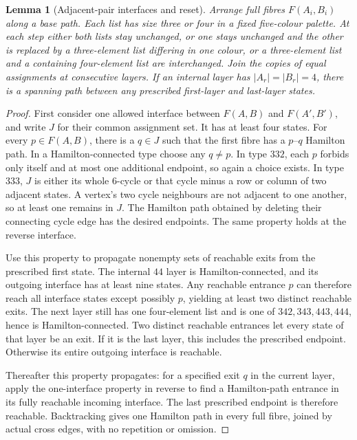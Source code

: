 \documentclass[11pt]{article}
\newtheorem{lemma}[theorem]{Lemma}
\theoremstyle{remark}
\numberwithin{equation}{section}
\begin{document}
\begin{lemma}[Adjacent-pair interfaces and reset]
\label{lem:pair-five-reset}
Arrange full fibres $F(A_i,B_i)$ along a base path.  Each list has
size three or four in a fixed five-colour palette.  At each step either
both lists stay unchanged, or one stays unchanged and the other is
replaced by a three-element list differing in one colour, or a
three-element list and a containing four-element list are interchanged.
Join the copies of equal assignments at consecutive layers.  If an
internal layer has $|A_r|=|B_r|=4$, there is a spanning path between
any prescribed first-layer and last-layer states.
\end{lemma}

\begin{proof}
First consider one allowed interface between $F(A,B)$ and $F(A',B')$,
and write $J$ for their common assignment set.  It has at least four
states.  For every $p\in F(A,B)$, there is a $q\in J$ such that the
first fibre has a $p$--$q$ Hamilton path.  In a Hamilton-connected
type choose any $q\ne p$.  In type $332$, each $p$ forbids only
itself and at most one additional endpoint, so again a choice exists.
In type $333$, $J$ is either its whole $6$-cycle or that cycle minus
a row or column of two adjacent states.  A vertex's two cycle
neighbours are not adjacent to one another, so at least one remains in
$J$.  The Hamilton path obtained by deleting their connecting cycle
edge has the desired endpoints.  The same property holds at the
reverse interface.

Use this property to propagate nonempty sets of reachable exits from
the prescribed first state.  The internal $44$ layer is
Hamilton-connected, and its outgoing interface has at least nine states.
Any reachable entrance $p$ can therefore reach all interface states
except possibly $p$, yielding at least two distinct reachable exits.
The next layer still has one four-element list and is one of
$342,343,443,444$, hence is Hamilton-connected.  Two distinct reachable
entrances let every state of that layer be an exit.  If it is the last
layer, this includes the prescribed endpoint.  Otherwise its entire
outgoing interface is reachable.

Thereafter this property propagates: for a specified exit $q$ in the
current layer, apply the one-interface property in reverse to find a
Hamilton-path entrance in its fully reachable incoming interface.
The last prescribed endpoint is therefore reachable.  Backtracking
gives one Hamilton path in every full fibre, joined by actual cross
edges, with no repetition or omission.
\end{proof}
\end{document}
